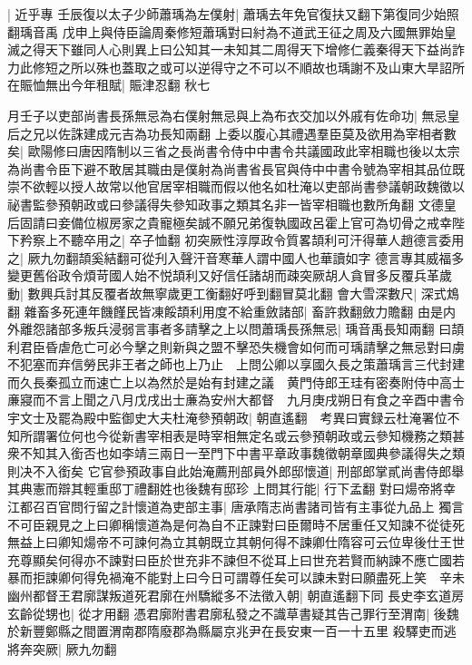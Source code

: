 |{
	近乎專}
壬辰復以太子少師蕭瑀為左僕射|{
	蕭瑀去年免官復扶又翻下第復同少始照翻瑀音禹}
戊申上與侍臣論周秦修短蕭瑀對曰紂為不道武王征之周及六國無罪始皇滅之得天下雖同人心則異上曰公知其一未知其二周得天下增修仁義秦得天下益尚詐力此修短之所以殊也蓋取之或可以逆得守之不可以不順故也瑀謝不及山東大旱詔所在賑恤無出今年租賦|{
	賑津忍翻}
秋七

月壬子以吏部尚書長孫無忌為右僕射無忌與上為布衣交加以外戚有佐命功|{
	無忌皇后之兄以佐誅建成元吉為功長知兩翻}
上委以腹心其禮遇羣臣莫及欲用為宰相者數矣|{
	歐陽修曰唐因隋制以三省之長尚書令侍中中書令共議國政此宰相職也後以太宗為尚書令臣下避不敢居其職由是僕射為尚書省長官與侍中中書令號為宰相其品位既崇不欲輕以授人故常以他官居宰相職而假以他名如杜淹以吏部尚書參議朝政魏徵以祕書監參預朝政或曰參議得失參知政事之類其名非一皆宰相職也數所角翻}
文德皇后固請曰妾備位椒房家之貴寵極矣誠不願兄弟復執國政呂霍上官可為切骨之戒幸陛下矜察上不聽卒用之|{
	卒子恤翻}
初突厥性淳厚政令質畧頡利可汗得華人趙德言委用之|{
	厥九勿翻頡奚結翻可從刋入聲汗音寒華人謂中國人也華讀如字}
德言專其威福多變更舊俗政令煩苛國人始不悦頡利又好信任諸胡而疎突厥胡人貪冒多反覆兵革歲動|{
	數興兵討其反覆者故無寧歲更工衡翻好呼到翻冒莫北翻}
會大雪深數尺|{
	深式鴆翻}
雜畜多死連年饑饉民皆凍餒頡利用度不給重斂諸部|{
	畜許救翻斂力贍翻}
由是内外離怨諸部多叛兵浸弱言事者多請擊之上以問蕭瑀長孫無忌|{
	瑀音禹長知兩翻}
曰頡利君臣昏虐危亡可必今擊之則新與之盟不擊恐失機會如何而可瑀請擊之無忌對曰虜不犯塞而弃信勞民非王者之師也上乃止　上問公卿以享國久長之策蕭瑀言三代封建而久長秦孤立而速亡上以為然於是始有封建之議　黄門侍郎王珪有密奏附侍中高士亷寢而不言上聞之八月戊戌出士亷為安州大都督　九月庚戌朔日有食之辛酉中書令宇文士及罷為殿中監御史大夫杜淹參預朝政|{
	朝直遙翻　考異曰實録云杜淹署位不知所謂署位何也今從新書宰相表是時宰相無定名或云參預朝政或云參知機務之類甚衆不知其入銜否也如李靖三兩日一至門下中書平章政事魏徵朝章國典參議得失之類則决不入銜矣}
它官參預政事自此始淹薦刑部員外郎邸懷道|{
	刑部郎掌貳尚書侍郎舉其典憲而辯其輕重邸丁禮翻姓也後魏有邸珍}
上問其行能|{
	行下孟翻}
對曰煬帝將幸江都召百官問行留之計懷道為吏部主事|{
	唐承隋志尚書諸司皆有主事從九品上}
獨言不可臣親見之上曰卿稱懷道為是何為自不正諫對曰臣爾時不居重任又知諫不從徒死無益上曰卿知煬帝不可諫何為立其朝既立其朝何得不諫卿仕隋容可云位卑後仕王世充尊顯矣何得亦不諫對曰臣於世充非不諫但不從耳上曰世充若賢而納諫不應亡國若暴而拒諫卿何得免禍淹不能對上曰今日可謂尊任矣可以諫未對曰願盡死上笑　辛未幽州都督王君廓謀叛道死君廓在州驕縱多不法徵入朝|{
	朝直遙翻下同}
長史李玄道房玄齡從甥也|{
	從才用翻}
憑君廓附書君廓私發之不識草書疑其告己罪行至渭南|{
	後魏於新豐鄭縣之間置渭南郡隋廢郡為縣屬京兆尹在長安東一百一十五里}
殺驛吏而逃將奔突厥|{
	厥九勿翻}
